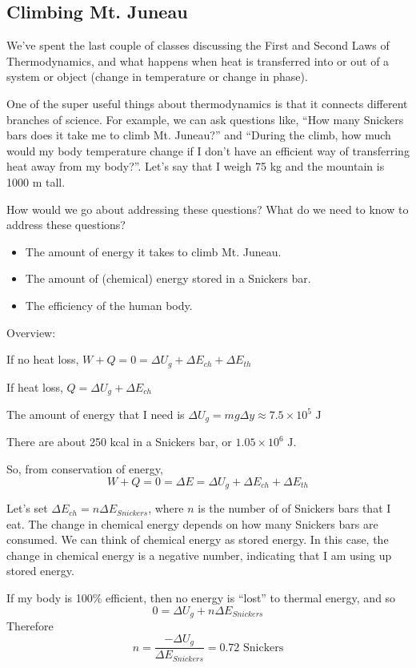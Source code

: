 \subsection{Climbing Mt. Juneau}
We've spent the last couple of classes discussing the First and Second Laws of Thermodynamics, and what happens when heat is transferred into or out of a system or object (change in temperature or change in phase).

One of the super useful things about thermodynamics is that it connects different branches of science. For example, we can ask questions like, ``How many Snickers bars does it take me to climb Mt. Juneau?'' and ``During the climb, how much would my body temperature change if I don't have an efficient way of transferring heat away from my body?''. Let's say that I weigh 75 kg and the mountain is 1000 m tall.

How would we go about addressing these questions? What do we need to know to address these questions?

\begin{itemize}
\item The amount of energy it takes to climb Mt. Juneau.
\item The amount of (chemical) energy stored in a Snickers bar.
\item The efficiency of the human body.
\end{itemize}

Overview:

If no heat loss, $W+Q=0=\Delta{U_g}+\Delta{E_{ch}}+\Delta{E_{th}}$

If heat loss, $Q=\Delta{U_g}+\Delta{E_{ch}}$


The amount of energy that I need is
$\Delta{U_g}=mg\Delta{y}\approx 7.5\times 10^5\mbox{ J}$

There are about 250 kcal in a Snickers bar, or $1.05\times 10^6\mbox{ J}$. 

So, from conservation of energy,
$$W+Q=0=\Delta{E}=\Delta{U_g}+\Delta{E_{ch}}+\Delta{E_{th}}$$

Let's set $\Delta{E_{ch}}=n\Delta{E_{Snickers}}$, where $n$ is the number of of Snickers bars that I eat. The change in chemical energy depends on how many Snickers bars are consumed. We can think of chemical energy as stored energy. In this case, the change in chemical energy is a negative number, indicating that I am using up stored energy.

If my body is 100\% efficient, then no energy is ``lost'' to thermal energy, and so 
$$0=\Delta{U_g}+n\Delta{E_{Snickers}}$$
Therefore
$$n=\frac{-\Delta{U_g}}{\Delta{E_{Snickers}}}=0.72\mbox{ Snickers}$$

